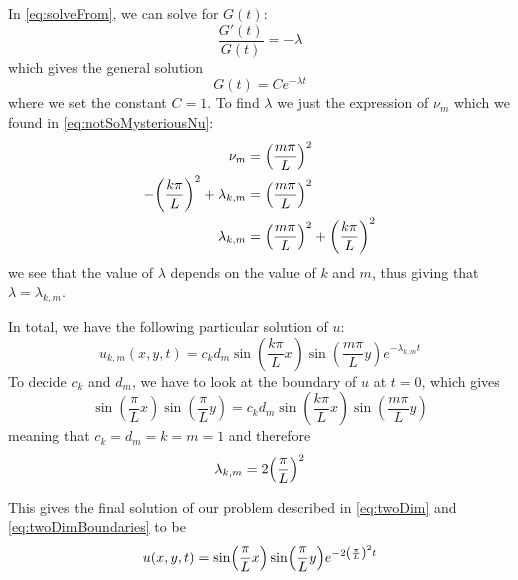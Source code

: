 \documentclass[12pt,english,a4paper]{article}
\begin{document}
In \vref{eq:solveFrom}, we can solve for \(G(t)\):
\[
\frac{G'(t)}{G(t)}  = -\lambda
\]
which gives the general solution
\[
G(t) = Ce^{-\lambda t}
\]
where we set the constant \(C = 1\). To find \(\lambda\) we just the expression of \(\nu_m\) which we found in \vref{eq:notSoMysteriousNu}:
\begin{align*}
\nu_m &= \qty(\frac{m\pi}{L})^2 \\
-\qty(\frac{k\pi}{L})^2 + \lambda_{k,m} &= \qty(\frac{m\pi}{L})^2  \\
\lambda_{k,m} &= \qty(\frac{m\pi}{L})^2+\qty(\frac{k\pi}{L})^2
\end{align*}
we see that the value of \(\lambda \) depends on the value of \(k\) and \(m\), thus giving that \(\lambda = \lambda_{k,m}\).

In total, we have the following particular solution of \(u\):
\[
u_{k,m}(x,y,t) =  c_kd_m\sin(\frac{k\pi}{L}x)\sin(\frac{m\pi}{L}y)e^{-\lambda_{k,m} t}
\]
To decide \(c_k\) and \(d_m\), we have to look at the boundary of \(u\) at \(t = 0\), which gives
\[
\sin(\frac{\pi}{L}x)\sin(\frac{\pi}{L}y) =  c_kd_m\sin(\frac{k\pi}{L}x)\sin(\frac{m\pi}{L}y)
\]
meaning that \(c_k = d_m = k = m = 1\) and therefore
\[
\lambda_{k,m} = 2\qty(\frac{\pi}{L})^2
\]

This gives the final solution of our problem described in \vref{eq:twoDim} and \vref{eq:twoDimBoundaries} to be
\[
u(x,y,t) = \sin(\frac{\pi}{L}x)\sin(\frac{\pi}{L}y)e^{-2\qty(\frac{\pi}{L})^2 t}
\]
\end{document}
